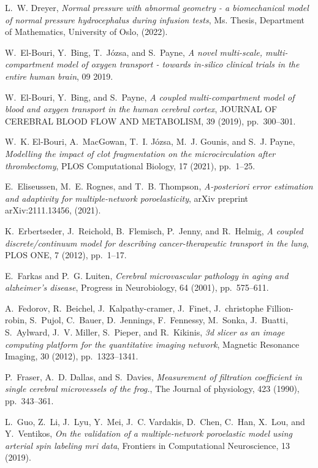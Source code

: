 \documentclass[10pt,letterpaper]{article}
\newcommand{\1}{^{(1)}}
\newcommand{\2}{^{(2)}}
\begin{document}
\begin{thebibliography}{10}
{\sc L.~W. Dreyer}, {\em Normal pressure with abnormal geometry - a
  biomechanical model of normal pressure hydrocephalus during infusion tests},
  Ms. Thesis, Department of Mathematics, University of Oslo,  (2022).

{\sc W.~El-Bouri, Y.~Bing, T.~Józsa, and S.~Payne}, {\em A novel multi-scale,
  multi-compartment model of oxygen transport - towards in-silico clinical
  trials in the entire human brain}, 09 2019.

{\sc W.~El-Bouri, Y.~Bing, and S.~Payne}, {\em A coupled multi-compartment
  model of blood and oxygen transport in the human cerebral cortex}, JOURNAL OF
  CEREBRAL BLOOD FLOW AND METABOLISM, 39 (2019), pp.~300--301.

{\sc W.~K. El-Bouri, A.~MacGowan, T.~I. Józsa, M.~J. Gounis, and S.~J. Payne},
  {\em Modelling the impact of clot fragmentation on the microcirculation after
  thrombectomy}, PLOS Computational Biology, 17 (2021), pp.~1--25.

{\sc E.~Eliseussen, M.~E. Rognes, and T.~B. Thompson}, {\em A-posteriori error
  estimation and adaptivity for multiple-network poroelasticity}, arXiv
  preprint arXiv:2111.13456,  (2021).

{\sc K.~Erbertseder, J.~Reichold, B.~Flemisch, P.~Jenny, and R.~Helmig}, {\em A
  coupled discrete/continuum model for describing cancer-therapeutic transport
  in the lung}, PLOS ONE, 7 (2012), pp.~1--17.

{\sc E.~Farkas and P.~G. Luiten}, {\em Cerebral microvascular pathology in
  aging and alzheimer's disease}, Progress in Neurobiology, 64 (2001),
  pp.~575--611.

{\sc A.~Fedorov, R.~Beichel, J.~Kalpathy-cramer, J.~Finet, J.~christophe
  Fillion-robin, S.~Pujol, C.~Bauer, D.~Jennings, F.~Fennessy, M.~Sonka,
  J.~Buatti, S.~Aylward, J.~V. Miller, S.~Pieper, and R.~Kikinis}, {\em 3d
  slicer as an image computing platform for the quantitative imaging network},
  Magnetic Resonance Imaging, 30 (2012), pp.~1323--1341.

{\sc P.~Fraser, A.~D. Dallas, and S.~Davies}, {\em Measurement of filtration
  coefficient in single cerebral microvessels of the frog.}, The Journal of
  physiology, 423 (1990), pp.~343--361.

{\sc L.~Guo, Z.~Li, J.~Lyu, Y.~Mei, J.~C. Vardakis, D.~Chen, C.~Han, X.~Lou,
  and Y.~Ventikos}, {\em On the validation of a multiple-network poroelastic
  model using arterial spin labeling mri data}, Frontiers in Computational
  Neuroscience, 13 (2019).


\end{thebibliography}
\end{document}
